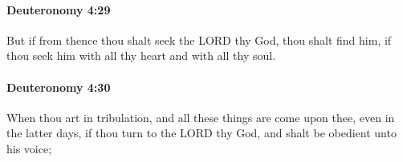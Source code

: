		\paragraph{Deuteronomy 4:29} %
			\label{DEUTERONOMY-4-29}

			But if from thence thou shalt seek the LORD thy God, thou shalt find him, if thou seek him with all thy heart and with all thy soul.


		\paragraph{Deuteronomy 4:30} %
			\label{DEUTERONOMY-4-30}

			When thou art in tribulation, and all these things are come upon thee, even in the latter days, if thou turn to the LORD thy God, and shalt be obedient unto his voice;


